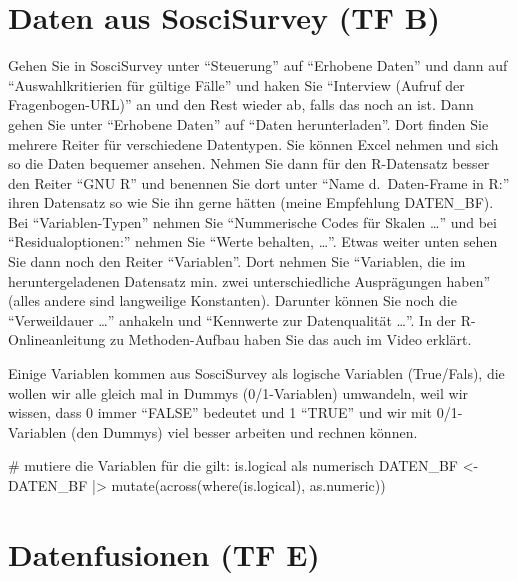 \documentclass[twoside, pagesize, fontsize=11pt, dvipsnames]{scrreport}
\newenvironment{Shaded}{\begin{snugshade}}{\end{snugshade}}
\newcommand{\CommentTok}[1]{\textcolor[rgb]{0.37,0.37,0.37}{#1}}
\newcommand{\FunctionTok}[1]{\textcolor[rgb]{0.28,0.35,0.67}{#1}}
\newcommand{\NormalTok}[1]{\textcolor[rgb]{0.00,0.23,0.31}{#1}}
\newcommand{\OtherTok}[1]{\textcolor[rgb]{0.00,0.23,0.31}{#1}}
\newcommand{\SpecialCharTok}[1]{\textcolor[rgb]{0.37,0.37,0.37}{#1}}
\begin{document}
\hypertarget{daten-aus-soscisurvey-tf-b}{%
\section{Daten aus SosciSurvey (TF
B)}\label{daten-aus-soscisurvey-tf-b}}

Gehen Sie in SosciSurvey unter \enquote{Steuerung} auf \enquote{Erhobene
Daten} und dann auf \enquote{Auswahlkritierien für gültige Fälle} und
haken Sie \enquote{Interview (Aufruf der Fragenbogen-URL)} an und den
Rest wieder ab, falls das noch an ist. Dann gehen Sie unter
\enquote{Erhobene Daten} auf \enquote{Daten herunterladen}. Dort finden
Sie mehrere Reiter für verschiedene Datentypen. Sie können Excel nehmen
und sich so die Daten bequemer ansehen. Nehmen Sie dann für den
R-Datensatz besser den Reiter \enquote{GNU R} und benennen Sie dort
unter \enquote{Name d.~Daten-Frame in R:} ihren Datensatz so wie Sie ihn
gerne hätten (meine Empfehlung DATEN\_BF). Bei \enquote{Variablen-Typen}
nehmen Sie \enquote{Nummerische Codes für Skalen \ldots{}} und bei
\enquote{Residualoptionen:} nehmen Sie \enquote{Werte behalten,
\ldots{}}. Etwas weiter unten sehen Sie dann noch den Reiter
\enquote{Variablen}. Dort nehmen Sie \enquote{Variablen, die im
heruntergeladenen Datensatz min. zwei unterschiedliche Ausprägungen
haben} (alles andere sind langweilige Konstanten). Darunter können Sie
noch die \enquote{Verweildauer \ldots{}} anhakeln und \enquote{Kennwerte
zur Datenqualität \ldots{}}. In der R-Onlineanleitung zu Methoden-Aufbau
haben Sie das auch im Video erklärt.

Einige Variablen kommen aus SosciSurvey als logische Variablen
(True/Fals), die wollen wir alle gleich mal in Dummys (0/1-Variablen)
umwandeln, weil wir wissen, dass 0 immer \enquote{FALSE} bedeutet und 1
\enquote{TRUE} und wir mit 0/1-Variablen (den Dummys) viel besser
arbeiten und rechnen können.

\begin{Shaded}
\begin{Highlighting}[]
\CommentTok{\# mutiere die Variablen für die gilt: is.logical als numerisch}
\NormalTok{DATEN\_BF }\OtherTok{\textless{}{-}}\NormalTok{ DATEN\_BF }\SpecialCharTok{|\textgreater{}} 
  \FunctionTok{mutate}\NormalTok{(}\FunctionTok{across}\NormalTok{(}\FunctionTok{where}\NormalTok{(is.logical), as.numeric))}
\end{Highlighting}
\end{Shaded}

\hypertarget{datenfusionen-tf-e}{%
\section{Datenfusionen (TF E)}\label{datenfusionen-tf-e}}
\end{document}
